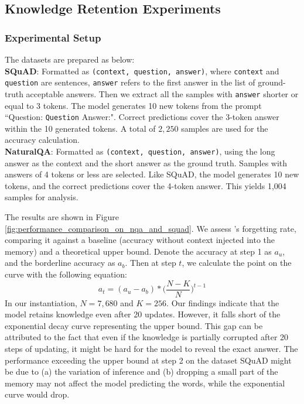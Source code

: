 \vspace{-5pt}
\subsection{Knowledge Retention Experiments}
\label{sub:customized_experiments}

\vspace{-2pt}
\subsubsection{Experimental Setup}
The datasets are prepared as below:\\
\textbf{SQuAD}: Formatted as \texttt{(context, question, answer)}, where \texttt{context} and \texttt{question} are sentences, \texttt{answer} refers to the first answer in the list of ground-truth acceptable answers. Then we extract all the samples with \texttt{answer} shorter or equal to $3$ tokens. The model generates 10 new tokens from the prompt ``Question: \texttt{Question} Answer:". Correct predictions cover the 3-token answer within the 10 generated tokens. A total of $2,250$ samples are used for the accuracy calculation. \\
\textbf{NaturalQA}: Formatted as \texttt{(context, question, answer)}, using the long answer as the context and the short answer as the ground truth. Samples with answers of 4 tokens or less are selected. Like SQuAD, the model generates 10 new tokens, and the correct predictions cover the 4-token answer. This yields 1,004 samples for analysis. 

The results are shown in Figure \ref{fig:performance_comparison_on_nqa_and_squad}. We assess \ours's forgetting rate, comparing it against a baseline (accuracy without context injected into the memory) and a theoretical upper bound. 
Denote the accuracy at step 1 as $a_u$, and the borderline accuracy as $a_b$. Then at step $t$, we calculate the point on the curve with the following equation: 
\begin{equation}
    a_t = (a_u - a_b) * \Big(\frac{N-K}{N}\Big)^{t-1}
\end{equation}
In our instantiation, $N=7,680$ and $K=256$. Our findings indicate that the model retains knowledge even after 20 updates. However, it falls short of the exponential decay curve representing the upper bound. This gap can be attributed to the fact that even if the knowledge is partially corrupted after 20 steps of updating, it might be hard for the model to reveal the exact answer. The performance exceeding the upper bound at step 2 on the dataset SQuAD might be due to (a) the variation of inference and (b) dropping a small part of the memory may not affect the model predicting the words, while the exponential curve would drop.


